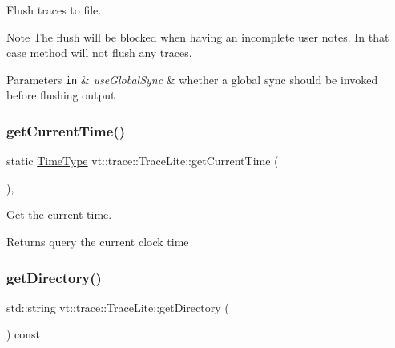Flush traces to file. 

\begin{DoxyNote}{Note}
The flush will be blocked when having an incomplete user notes. In that case method will not flush any traces.
\end{DoxyNote}

\begin{DoxyParams}[1]{Parameters}
\mbox{\tt in}  & {\em use\+Global\+Sync} & whether a global sync should be invoked before flushing output \\
\hline
\end{DoxyParams}
\mbox{\label{structvt_1_1trace_1_1_trace_lite_a5ddfc40d8206946d33630d4b81b6126c}} 
\subsubsection{\texorpdfstring{get\+Current\+Time()}{getCurrentTime()}}
{\footnotesize\ttfamily static \hyperlink{namespacevt_a2b9f28078dc309ad0706b69ded743e69}{Time\+Type} vt\+::trace\+::\+Trace\+Lite\+::get\+Current\+Time (\begin{DoxyParamCaption}{ }\end{DoxyParamCaption})\hspace{0.3cm}{\ttfamily [inline]}, {\ttfamily [static]}}



Get the current time. 

\begin{DoxyReturn}{Returns}
query the current clock time 
\end{DoxyReturn}
\mbox{\label{structvt_1_1trace_1_1_trace_lite_aee5f10410a94c3149eefe595ccb2bbab}} 
\subsubsection{\texorpdfstring{get\+Directory()}{getDirectory()}}
{\footnotesize\ttfamily std\+::string vt\+::trace\+::\+Trace\+Lite\+::get\+Directory (\begin{DoxyParamCaption}{ }\end{DoxyParamCaption}) const\hspace{0.3cm}{\ttfamily [inline]}}



